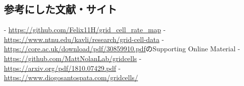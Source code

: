 \subsection{参考にした文献・サイト}- \url{https://github.com/Felix11H/grid_cell_rate_map}
- \url{https://www.ntnu.edu/kavli/research/grid-cell-data}
- \url{https://core.ac.uk/download/pdf/30859910.pdf}のSupporting Online Material
- \url{https://github.com/MattNolanLab/gridcells}
- \url{https://arxiv.org/pdf/1810.07429.pdf}
- \url{https://www.diogosantospata.com/gridcells/}